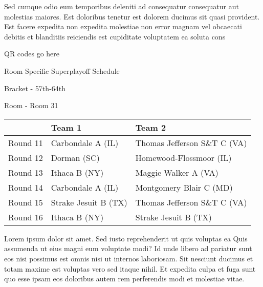 \documentclass{article}%
\begin{document}
\newline%
    Sed cumque odio eum temporibus deleniti ad consequatur consequatur aut molestias maiores. Est doloribus tenetur est dolorem ducimus sit quasi provident. Est facere expedita non expedita molestiae non error magnam vel obcaecati debitis et blanditiis reiciendis est cupiditate voluptatem ea soluta cons%
\vspace*{140pt}%
\begin{center}%
\begin{Huge}%
QR codes go here%
\end{Huge}%
\end{center}%
\newpage%
\begin{center}%
\begin{Huge}%
Room Specific Superplayoff Schedule%
\end{Huge}%
\vspace*{8pt}%
\linebreak%
\begin{Large}%
Bracket {-} 57th{-}64th%
\end{Large}%
\vspace*{8pt}%
\linebreak%
\vspace*{8pt}%
\begin{Large}%
Room {-} Room 31%
\end{Large}%
\end{center}%
%
\begin{tabularx}{\textwidth}{|c|Y|Y|}%
\hline%
&Team 1&Team 2\\%
\hline%
Round 11&Carbondale A (IL)&Thomas Jefferson S\&T C (VA)\\%
Round 12&Dorman (SC)&Homewood{-}Flossmoor (IL)\\%
Round 13&Ithaca B (NY)&Maggie Walker A (VA)\\%
Round 14&Carbondale A (IL)&Montgomery Blair C (MD)\\%
Round 15&Strake Jesuit B (TX)&Thomas Jefferson S\&T C (VA)\\%
Round 16&Ithaca B (NY)&Strake Jesuit B (TX)\\%
\hline%
\end{tabularx}%
\vspace*{8pt}%
\newline%
    Lorem ipsum dolor sit amet. Sed iusto reprehenderit ut quis voluptas ea Quis assumenda ut eius magni eum voluptate modi? Id unde libero ad pariatur sunt eos nisi possimus est omnis nisi ut internos laboriosam. Sit nesciunt ducimus et totam maxime est voluptas vero sed itaque nihil. Et expedita culpa et fuga sunt quo esse ipsam eos doloribus autem rem perferendis modi et molestiae vitae.\newline%
\end{document}
